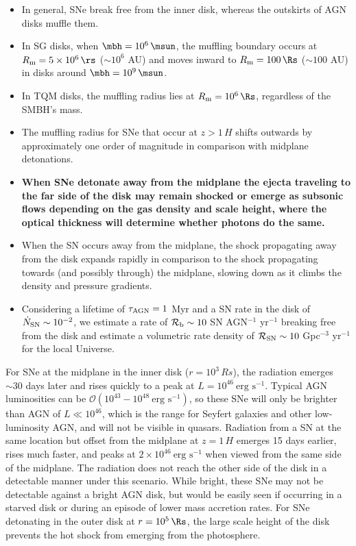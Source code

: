 \begin{itemize}
    \item In general, SNe break free from the inner disk, whereas the outskirts of AGN disks muffle them.
    \item In SG disks, when $\mbh=10^6\,\msun$, the muffling boundary occurs at $R_{\rm m}=5\times10^6\,\rs$ ($\sim10^6$ AU) and moves inward to $R_{\rm m}=100\,\Rs$ ($\sim100$ AU) in disks around $\mbh=10^9\,\msun$.
    \item In TQM disks, the muffling radius lies at $R_{\rm m}=10^6\,\Rs$, regardless of the SMBH's mass.
    \item The muffling radius for SNe that occur at $z>1\,H$ shifts outwards by approximately one order of magnitude in comparison with midplane detonations.
    \item \textbf{When SNe detonate away from the midplane the ejecta traveling to the far side of the disk may remain shocked or emerge as subsonic flows depending on the gas density and scale height, where the optical thickness will determine whether photons do the same.}
    \item When the SN occurs away from the midplane, the shock propagating away from the disk expands rapidly in comparison to the shock propagating towards (and possibly through) the midplane, slowing down as it climbs the density and pressure gradients.
    \item Considering a lifetime of $\tau_{\rm AGN}=1$ Myr and a SN rate in the disk of $\dot{N}_{\rm SN} \sim 10^{-2}$, we estimate a rate of $\mathcal{R}_{\rm b} \sim 10$ SN AGN$^{-1}$ yr$^{-1}$ breaking free from the disk and estimate a volumetric rate density of $\mathcal{R}_{\rm SN} \sim 10$ Gpc$^{-3}$ yr$^{-1}$ for the local Universe.
\end{itemize}

For SNe at the midplane in the inner disk ($r=10^3\,Rs$), the radiation emerges $\sim30$ days later and rises quickly to a peak at $L=10^{46}\ \text{erg s}^{-1}$.
Typical AGN luminosities can be $\mathcal{O}(10^{43}-10^{48}\ \text{erg s}^{-1})$, so these SNe will only be brighter than AGN of $L\ll10^{46}$, which is the range for Seyfert galaxies and other low-luminosity AGN, and will not be visible in quasars.
Radiation from a SN at the same location but offset from the midplane at $z=1\,H$ emerges 15 days earlier, rises much faster, and peaks at $2 \times 10^{46}\ \text{erg s}^{-1}$ when viewed from the same side of the midplane.
The radiation does not reach the other side of the disk in a detectable manner under this scenario.
While bright, these SNe may not be detectable against a bright AGN disk, but would be easily seen if occurring in a starved disk or during an episode of lower mass accretion rates.
For SNe detonating in the outer disk at $r=10^5\,\Rs$, the large scale height of the disk prevents the hot shock from emerging from the photosphere.

